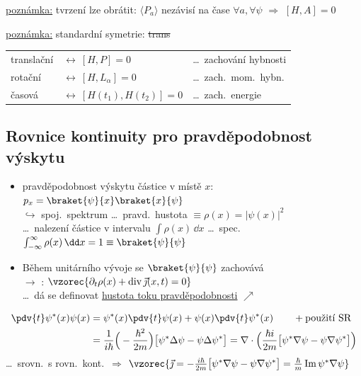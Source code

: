 \underline{poznámka:} tvrzení lze obrátit: \quad $\langle P_a\rangle$ nezávisí na čase $\forall a,\forall\psi$ \quad $\Rightarrow$ \quad $[H,A] = 0$

\underline{poznámka:} standardní symetrie: \sout{trans}
\begin{center}
\begin{tabular}{lll}
translační & $\longleftrightarrow\ [H,P] = 0$ & \dots\ zachování hybnosti \\
rotační & $\longleftrightarrow\ [H,L_\alpha] = 0$ & \dots\ zach.\ mom.\ hybn. \\
časová & $\longleftrightarrow\ [H(t_1),H(t_2)] = 0$ & \dots\ zach.\ energie
\end{tabular}
\end{center}

\subsection{Rovnice kontinuity pro pravděpodobnost výskytu}
\begin{itemize}
  \item pravděpodobnost výskytu částice v místě $x$: \quad $p_x = \braket{\psi}{x}\braket{x}{\psi}$ \\
        \hspace*{3cm} $\hookrightarrow$ spoj.\ spektrum \dots\ pravd.\ hustota $\equiv\rho(x) = |\psi(x)|^2$ \\
        \dots\ nalezení částice v intervalu $\int\rho(x)\,\dd x$ \dots\ spec.\ $\int_{-\infty}^{\infty}\rho(x)\,\dd x = 1 \equiv \braket{\psi}{\psi}$
  \item Během unitárního vývoje se $\braket{\psi}{\psi}$ zachovává \\
        $\to$ : \quad $\vzorec{\partial_t\rho(x) + \operatorname{div}\vec\jmath(x,t) = 0}$ \\
        \dots\ dá se definovat \underline{hustota toku pravděpodobnosti} $\nearrow$
\end{itemize}
\begin{align*}
  \pdv{t}\psi^*(x)\psi(x) &= \psi^*(x)\pdv{t}\psi(x) + \psi(x)\pdv{t}\psi^*(x) \qquad + \text{použití SR} \\
  &= \frac{1}{i\hbar}\Big(-\frac{\hbar^2}{2m}\Big)\big[\psi^*\Delta\psi - \psi\Delta\psi^*\big]
   = \nabla\cdot\Big(\frac{\hbar i}{2m}\big[\psi^*\nabla\psi - \psi\nabla\psi^*\big]\Big)
\end{align*}
\dots\ srovn.\ s rovn.\ kont.\ $\Rightarrow$ \quad
$\vzorec{\vec\jmath = -\frac{i\hbar}{2m}\big[\psi^*\nabla\psi - \psi\nabla\psi^*\big] = \frac{\hbar}{m}\operatorname{Im}\psi^*\nabla\psi}$

